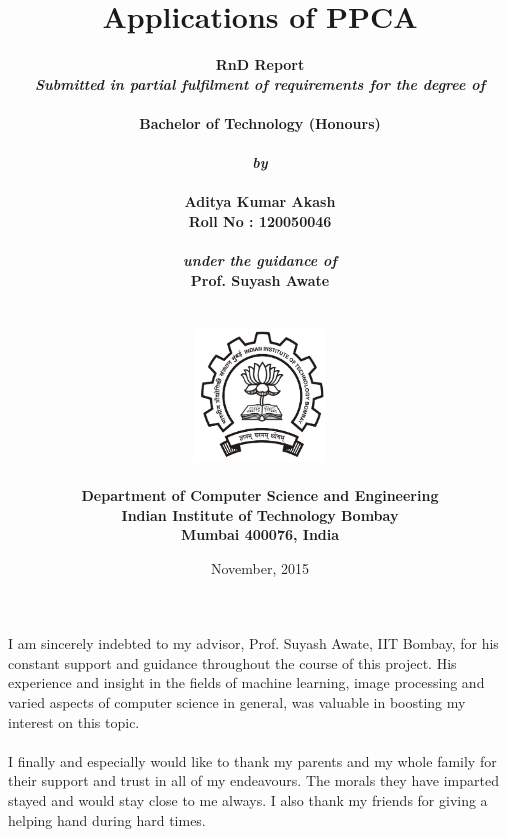 \documentclass[a4paper, twoside, 12pt, fleqn]{report}
\title{\textbf{Applications of PPCA}}
\author{
		\bf{RnD Report}\\
        \emph{Submitted in partial fulfilment of requirements for the degree of}\\\\
        \bf{Bachelor of Technology (Honours)}\\
        \\
        \emph{by}\\\\
		\bf{Aditya Kumar Akash}\\
        Roll No : 120050046\\
        \\
        \emph{under the guidance of}\\
		\bf{Prof. Suyash Awate}\\
        \\\\
        \includegraphics[height=3.5cm]{./iitb_logo.jpg}\\
        \\
		\bf{Department of Computer Science and Engineering}\\
        \bf{Indian Institute of Technology Bombay}\\
        \bf{Mumbai 400076, India}\\
}
\date{November, 2015}
\makeatletter
\newcommand\frontmatter{%
  \cleardoublepage
  \pagenumbering{roman}}
\newcommand\mainmatter{%
  \cleardoublepage
  \pagenumbering{arabic}}
\makeatother
\begin{document}
\allowdisplaybreaks
\setlength{\abovedisplayskip}{0pt}
\setlength{\belowdisplayskip}{0pt}
\setlength{\abovedisplayshortskip}{0pt}
\setlength{\belowdisplayshortskip}{0pt}
\sloppy

\frontmatter
\maketitle
\cleardoublepage
\tableofcontents

\chapter*{}


\chapter*{}
I am sincerely indebted to my advisor, Prof. Suyash Awate, IIT Bombay, for his constant support and guidance throughout the course of this project. His experience and insight in the fields of machine learning, image processing and varied aspects of computer science in general, was valuable in boosting my interest on this topic. \\\\
I finally and especially would like to thank my parents and my whole family for their support and trust in all of my endeavours. The morals they have imparted stayed and would stay close to me always. I also thank my friends for giving a helping hand during hard times.

\cleardoublepage
\mainmatter

\linespread{1.2}
\setlength{\parindent}{2em}
\setlength{\parskip}{0.5em}
\pagebreak








\end{document}
